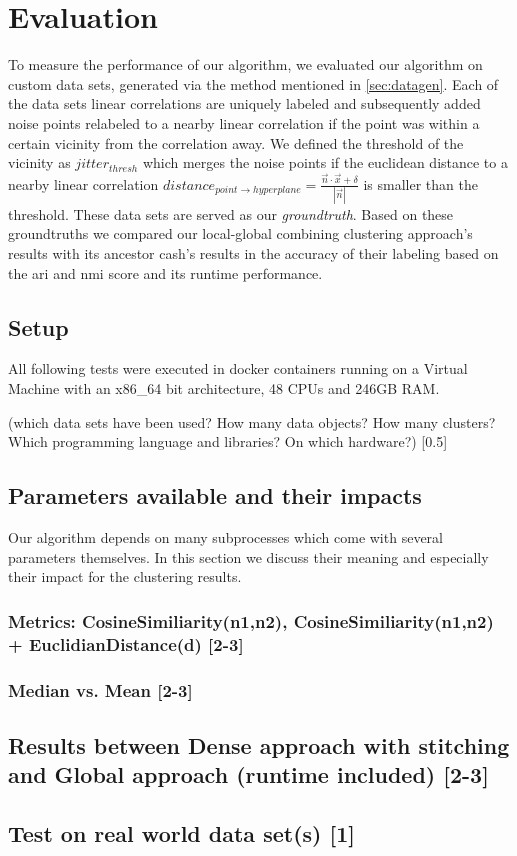 \chapter{Evaluation}
To measure the performance of our algorithm, we evaluated  our algorithm on custom data sets, generated via the method mentioned in \autoref{sec:datagen}. Each of the data sets linear correlations are uniquely labeled and subsequently added noise points relabeled to a nearby linear correlation if the point was within a certain vicinity from the correlation away. We defined the threshold of the vicinity as $jitter_{thresh}$ which merges the noise points if the euclidean distance to a nearby linear correlation $distance_{point\rightarrow hyperplane} = \frac{\Vec{n}\cdot\Vec{x}+\delta}{|\Vec{n}|}$ is smaller than the threshold. These data sets are served as our \textit{groundtruth}. Based on these groundtruths we compared our local-global combining clustering approach's results with its ancestor \gls{cash}'s results in the accuracy of their labeling based on the \gls{ari} and \gls{nmi} score and its runtime performance. 

\section{Setup}


All following tests were executed in docker containers running on a Virtual Machine with an x86\_64 bit architecture, 48 CPUs and 246GB RAM. 

(which data sets have been used? How many data objects? How many clusters? Which programming language and libraries? On which hardware?) [0.5]

\section{Parameters available and their impacts}
Our algorithm depends on many subprocesses which come with several parameters themselves. In this section we discuss their meaning and especially their impact for the clustering results.

\subsection{Metrics: CosineSimiliarity(n1,n2), CosineSimiliarity(n1,n2) + EuclidianDistance(d) [2-3]}

\subsection{Median vs.  Mean [2-3]}

\section{Results between Dense approach with stitching and Global approach (runtime included) [2-3]
}

\section{Test on real world data set(s) [1]}

